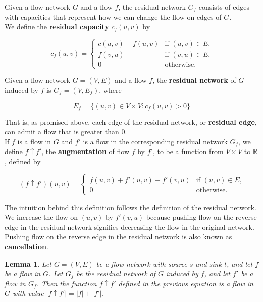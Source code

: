 \documentclass[12pt]{article}
\newtheorem{lemma}[theorem]{Lemma}
\begin{document}
Given a flow network $G$ and a flow $f$, the residual network $G_f$ consists of edges with capacities that represent how we can change the flow on edges of $G$. \\

We define the \textbf{residual capacity} $c_f(u,v)$ by

\begin{equation*}
  c_f(u,v) =
  \begin{cases}
    c(u,v) - f(u,v) & \text{if $(u,v) \in E$,} \\
    f(v,u) & \text{if $(v,u) \in E$,} \\
    0 & \text{otherwise.}
  \end{cases}
\end{equation*}

Given a flow network $G = (V,E)$ and a flow $f$, the \textbf{residual network} of $G$ induced by $f$ is $G_f = (V, E_f)$, where

\begin{equation*}
  E_f = \{ (u,v) \in V \times V : c_f(u,v) > 0 \}
\end{equation*}

That is, as promised above, each edge of the residual network, or \textbf{residual edge}, can admit a flow that is greater than 0. \\

If $f$ is a flow in $G$ and $f'$ is a flow in the corresponding residual network $G_f$, we define $f \uparrow f'$, the \textbf{augmentation} of flow $f$ by $f'$, to be a function from $V \times V$ to $\mathbb{R}$, defined by

\begin{equation*}
  (f \uparrow f')(u,v) =
  \begin{cases}
    f(u,v) + f'(u,v) - f'(v,u) & \text{if $(u,v) \in E$,} \\
    0 & \text{otherwise.}
  \end{cases}
\end{equation*}

The intuition behind this definition follows the definition of the residual network. We increase the flow on $(u,v)$ by $f'(v,u)$ because pushing flow on the reverse edge in the residual network signifies decreasing the flow in the original network. Pushing flow on the reverse edge in the residual network is also known as \textbf{cancellation}.

\begin{lemma}
  Let $G = (V,E)$ be a flow network with source $s$ and sink $t$, and let $f$ be a flow in $G$. Let $G_f$ be the residual network of $G$ induced by $f$, and let $f'$ be a flow in $G_f$. Then the function $f \uparrow f'$ defined in the previous equation is a flow in $G$ with value $|f \uparrow f'| = |f| + |f'|$.
\end{lemma}
\end{document}
